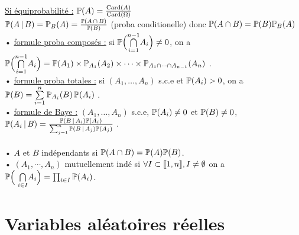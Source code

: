 \documentclass[12 pt]{exampleclass}
\begin{document}
\begin{flushleft}
\begin{doublespace}
	\text{ }\\
	\underline{Si équiprobabilité :} $\mathbb{P}(A) = \frac{\text{Card}(A)}{\text{Card}(\Omega)}$\\
	$\mathbb{P}(A \, | \, B) = \mathbb{P}_B(A) = \frac{\mathbb{P}(A\,\cap\,B)}{\mathbb{P}(B)}$ (proba conditionelle) donc $\mathbb{P}(A \cap B) = \mathbb{P}(B)\mathbb{P}_B(A)$\\
	• \underline{formule proba composés :} si $\mathbb{P} \Big( \underset{i = 1}{\overset{n - 1}{\bigcap}} A_i \Big) \ne 0$, on a $\mathbb{P} \Big( \underset{i = 1}{\overset{n - 1}{\bigcap}} A_i \Big) = \mathbb{P}(A_1) \times \mathbb{P}_{A_1}(A_2)\times \dots \times \mathbb{P}_{A_1 \cap \dots \cap A_{n - 1}} (A_n)$ .\\
	• \underline{formule proba totales :} si $(A_1,\dots, A_n)$ s.c.e et $\mathbb{P}(A_i) > 0$, on a $\mathbb{P}(B) = \sum\limits_{i = 1}^n \mathbb{P}_{A_i}(B)\, \mathbb{P}(A_i)$ .\\
	• \underline{formule de Baye :} $(A_1,\dots, A_n)$ s.c.e, $\mathbb{P}(A_i) \ne 0$ et $\mathbb{P}(B)\ne 0$, $\mathbb{P}(A_i \, | \, B) = \frac{\mathbb{P}( B \, | \, A_i) \mathbb{P}(A_i)}{\sum_{j = 1}^n \mathbb{P}( B \, | \, A_j) \mathbb{P} (A_j)}$ .\\
	
	\text{ }\\
	• $A$ et $B$  indépendants si $\mathbb{P}(A \cap B) = \mathbb{P}(A)\mathbb{P}(B)$.\\
	• $(A_1,\cdots, A_n)$ mutuellement indé si $\forall I \subset \llbracket 1,n \rrbracket , I \ne \emptyset$ on a $\mathbb{P}\Big(\ \underset{i \in I}{\bigcap} A_i \Big) = \prod_{i\in I} \mathbb{P}(A_i)$.\\

\end{doublespace}
\end{flushleft}

\section{Variables aléatoires réelles}
\end{document}
